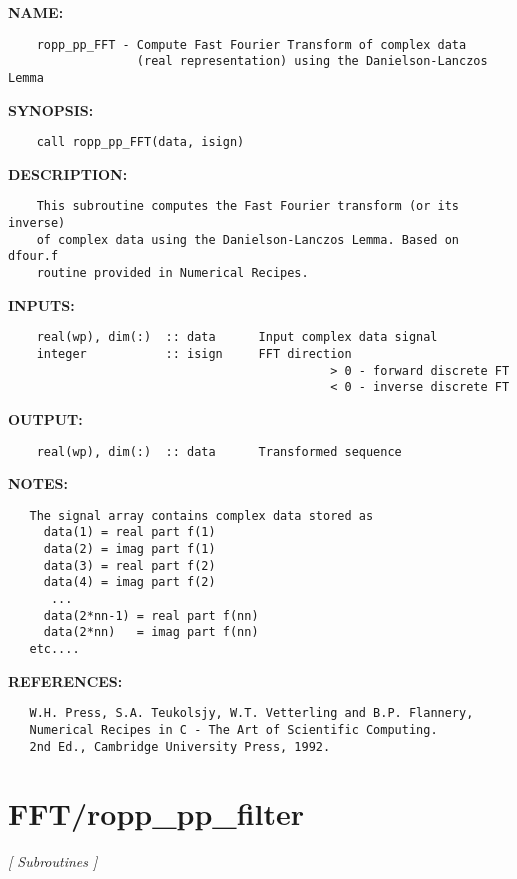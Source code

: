 \label{ch:robo14}
\label{ch:FFT_ropp_pp_FFT_real}
\textbf{NAME:}\hspace{0.08in}\begin{Verbatim}
    ropp_pp_FFT - Compute Fast Fourier Transform of complex data
                  (real representation) using the Danielson-Lanczos Lemma
\end{Verbatim}
\textbf{SYNOPSIS:}\hspace{0.08in}\begin{Verbatim}
    call ropp_pp_FFT(data, isign)
\end{Verbatim}
\textbf{DESCRIPTION:}\hspace{0.08in}\begin{Verbatim}
    This subroutine computes the Fast Fourier transform (or its inverse)
    of complex data using the Danielson-Lanczos Lemma. Based on dfour.f
    routine provided in Numerical Recipes.
\end{Verbatim}
\textbf{INPUTS:}\hspace{0.08in}\begin{Verbatim}
    real(wp), dim(:)  :: data      Input complex data signal
    integer           :: isign     FFT direction
                                             > 0 - forward discrete FT
                                             < 0 - inverse discrete FT
\end{Verbatim}
\textbf{OUTPUT:}\hspace{0.08in}\begin{Verbatim}
    real(wp), dim(:)  :: data      Transformed sequence
\end{Verbatim}
\textbf{NOTES:}\hspace{0.08in}\begin{Verbatim}
   The signal array contains complex data stored as
     data(1) = real part f(1)
     data(2) = imag part f(1)
     data(3) = real part f(2)
     data(4) = imag part f(2)
      ...
     data(2*nn-1) = real part f(nn)
     data(2*nn)   = imag part f(nn)
   etc....
\end{Verbatim}
\textbf{REFERENCES:}\hspace{0.08in}\begin{Verbatim}
   W.H. Press, S.A. Teukolsjy, W.T. Vetterling and B.P. Flannery,
   Numerical Recipes in C - The Art of Scientific Computing.
   2nd Ed., Cambridge University Press, 1992.
\end{Verbatim}
\section{FFT/ropp\_pp\_filter}
\textsl{[ Subroutines ]}

